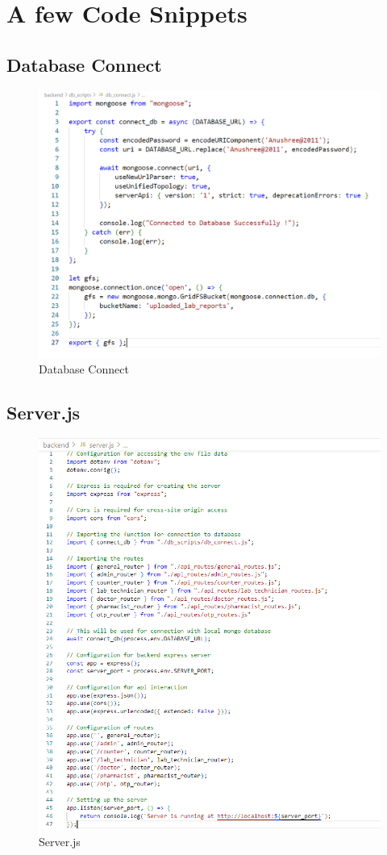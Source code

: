 \section{A few Code Snippets}
\subsection{Database Connect}
\begin{figure}[h!]
    \centering
    \includegraphics[width=\textwidth]{dbconnect.png}
    \caption{Database Connect}
\end{figure}
\clearpage
\subsection{Server.js}
\begin{figure}[h!]
    \centering
    \includegraphics[width=\textwidth]{server.png}
    \caption{Server.js}
\end{figure}
\clearpage
